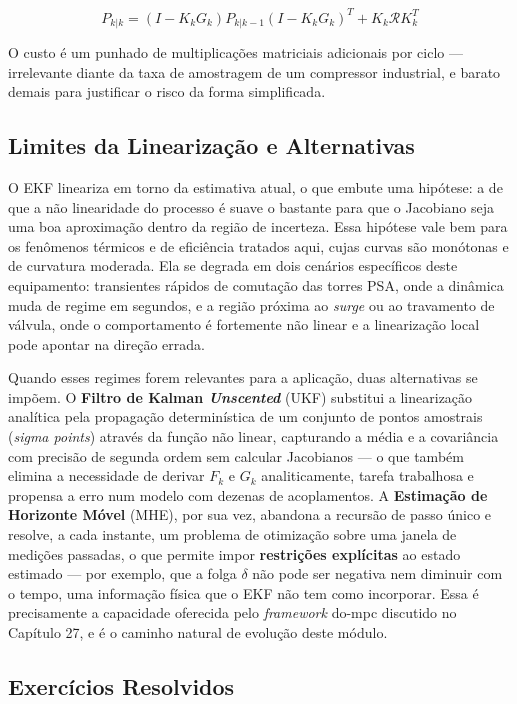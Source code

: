 \documentclass[12pt,a4paper]{article}
\numberwithin{equation}{section}
\numberwithin{table}{section}
\numberwithin{figure}{section}
\begin{document}
	\begin{equation}\label{eq:s21-8}
	P_{k|k} = (I - K_k G_k) P_{k|k-1} (I - K_k G_k)^T + K_k \mathcal{R} K_k^T
\end{equation}

	O custo é um punhado de multiplicações matriciais adicionais por ciclo — irrelevante diante da taxa de amostragem de um compressor industrial, e barato demais para justificar o risco da forma simplificada.

	\subsection{Limites da Linearização e Alternativas}

	O EKF lineariza em torno da estimativa atual, o que embute uma hipótese: a de que a não linearidade do processo é suave o bastante para que o Jacobiano seja uma boa aproximação dentro da região de incerteza. Essa hipótese vale bem para os fenômenos térmicos e de eficiência tratados aqui, cujas curvas são monótonas e de curvatura moderada. Ela se degrada em dois cenários específicos deste equipamento: transientes rápidos de comutação das torres PSA, onde a dinâmica muda de regime em segundos, e a região próxima ao \textit{surge} ou ao travamento de válvula, onde o comportamento é fortemente não linear e a linearização local pode apontar na direção errada.

	Quando esses regimes forem relevantes para a aplicação, duas alternativas se impõem. O \textbf{Filtro de Kalman \textit{Unscented}} (UKF) substitui a linearização analítica pela propagação determinística de um conjunto de pontos amostrais (\textit{sigma points}) através da função não linear, capturando a média e a covariância com precisão de segunda ordem sem calcular Jacobianos — o que também elimina a necessidade de derivar $F_k$ e $G_k$ analiticamente, tarefa trabalhosa e propensa a erro num modelo com dezenas de acoplamentos. A \textbf{Estimação de Horizonte Móvel} (MHE), por sua vez, abandona a recursão de passo único e resolve, a cada instante, um problema de otimização sobre uma janela de medições passadas, o que permite impor \textbf{restrições explícitas} ao estado estimado — por exemplo, que a folga $\delta$ não pode ser negativa nem diminuir com o tempo, uma informação física que o EKF não tem como incorporar. Essa é precisamente a capacidade oferecida pelo \textit{framework} do-mpc discutido no Capítulo 27, e é o caminho natural de evolução deste módulo.

	\subsection{Exercícios Resolvidos}
\end{document}
